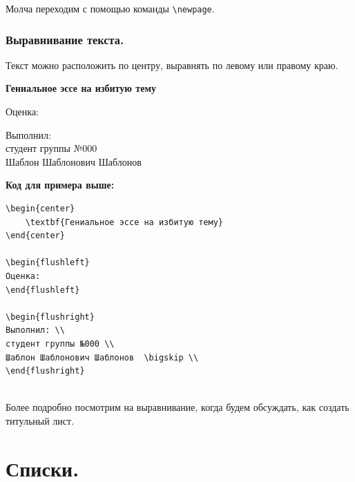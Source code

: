 \documentclass[12pt]{article}
\begin{document}
Молча переходим с помощью команды \texttt{\textbackslash newpage}. 

\newpage

\subsubsection{Выравнивание текста.}

Текст можно расположить по центру, выравнять по левому или правому краю. 

\begin{center}
    \textbf{Гениальное эссе на избитую тему}
\end{center}

\begin{flushleft}
Оценка:
\end{flushleft}

\begin{flushright}
Выполнил: \\
студент группы №000 \\
Шаблон Шаблонович Шаблонов  \bigskip \\
\end{flushright}

\textbf{Код для примера выше:}  \bigskip\\

\begin{BVerbatim}
\begin{center}
    \textbf{Гениальное эссе на избитую тему}
\end{center}

\begin{flushleft}
Оценка:
\end{flushleft}

\begin{flushright}
Выполнил: \\
студент группы №000 \\
Шаблон Шаблонович Шаблонов  \bigskip \\
\end{flushright}
\end{BVerbatim}

 \ \ \medskip\\

Более подробно посмотрим на выравнивание, когда будем обсуждать, как создать титульный лист.

\section{Списки.}
\end{document}
